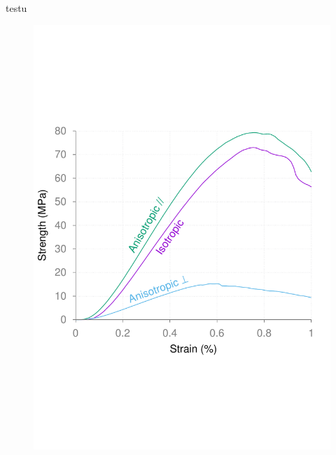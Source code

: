 \documentclass{article}
\begin{document}
	testu
	\begin{figure}[ht]
		\centering
		\includegraphics[width=\linewidth]{figures/sup_fig1}
	\end{figure}
\end{document}
